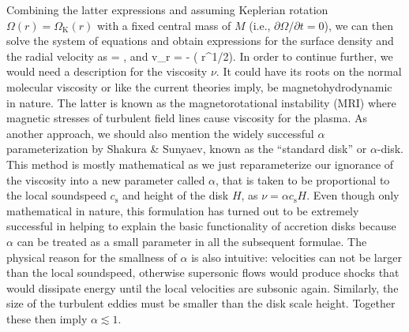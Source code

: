 Combining the latter expressions and assuming Keplerian rotation $\Omega(r) = \Omega_{\mathrm{K}}(r)$ with a fixed central mass of $M$ (i.e., $\partial\Omega/\partial t = 0$), we can then solve the system of equations and obtain expressions for the surface density and the radial velocity as
\be\label{eq:disk_st_1}
 =   ,
\ee
and
\be\label{eq:disk_st_2}
v_r = -  ( \nu \Sigma r^{1/2}).
\ee
In order to continue further, we would need a description for the viscosity $\nu$.
It could have its roots on the normal molecular viscosity\cite{ChapmanCowling52} or like the current theories imply, be magnetohydrodynamic in nature.
The latter is known as the magnetorotational instability (MRI) where magnetic stresses of turbulent field lines cause viscosity for the plasma. \cite{Velikhov59, Cha60, BH91} 
As another approach, we should also mention the widely successful $\alpha$ parameterization by Shakura \& Sunyaev, known as the ``standard disk'' or $\alpha$-disk.\cite{SS73}
This method is mostly mathematical as we just reparameterize our ignorance of the viscosity into a new parameter called $\alpha$, that is taken to be proportional to the local soundspeed $c_{\mathrm{s}}$ and height of the disk $H$, as $\nu = \alpha c_{\mathrm{s}} H$.
Even though only mathematical in nature, this formulation has turned out to be extremely successful in helping to explain the basic functionality of accretion disks because $\alpha$ can be treated as a small parameter in all the subsequent formulae.
The physical reason for the smallness of $\alpha$ is also intuitive: velocities can not be larger than the local soundspeed, otherwise supersonic flows would produce shocks that would dissipate energy until the local velocities are subsonic again.
Similarly, the size of the turbulent eddies must be smaller than the disk scale height. 
Together these then imply $\alpha \lesssim 1$.

